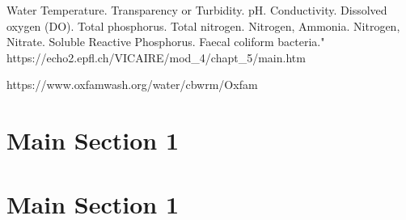Water Temperature.
Transparency or Turbidity.
pH.
Conductivity.
Dissolved oxygen (DO).
Total phosphorus.
Total nitrogen.
Nitrogen, Ammonia.
Nitrogen, Nitrate.
Soluble Reactive Phosphorus.
Faecal coliform bacteria." https://echo2.epfl.ch/VICAIRE/mod_4/chapt_5/main.htm

https://www.oxfamwash.org/water/cbwrm/Oxfam%

\section{Main Section 1}


\section{Main Section 1}
